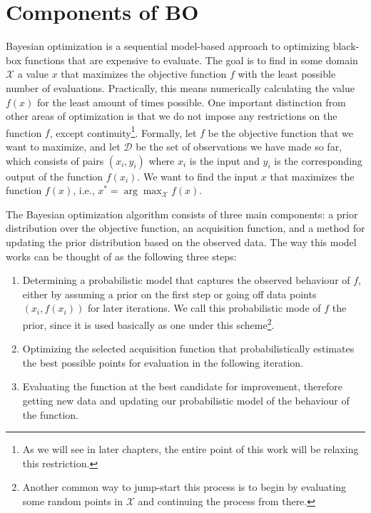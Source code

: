 \section{Components of BO}

Bayesian optimization is a sequential model-based approach to optimizing black-box functions that are expensive to evaluate. The goal is to find in some domain $\mathcal{X}$ a value $x$ that maximizes the objective function $f$ with the least possible number of evaluations. Practically, this means numerically calculating the value $f(x)$ for the least amount of times possible. One important distinction from other areas of optimization is that we do not impose any restrictions on the function $f$, except continuity\footnote{As we will see in later chapters, the entire point of this work will be relaxing this restriction.}. Formally, let $f$ be the objective function that we want to maximize, and let $\mathcal{D}$ be the set of observations we have made so far, which consists of pairs $(x_i, y_i)$ where $x_i$ is the input and $y_i$ is the corresponding output of the function $f(x_i)$. We want to find the input $x$ that maximizes the function $f(x)$, i.e., $x^* = \arg\max_\mathcal{X}  f(x)$.

The Bayesian optimization algorithm consists of three main components: a prior distribution over the objective function, an acquisition function, and a method for updating the prior distribution based on the observed data. The way this model works can be thought of as the following three steps: 
\begin{enumerate}
	\item Determining a probabilistic model that captures the observed behaviour of $f$, either by assuming a prior on the first step or going off data points $(x_i, f(x_i))$ for later iterations. We call this probabilistic mode of $f$ the prior, since it is used basically as one under this scheme\footnote{Another common way to jump-start this process is to begin by evaluating some random points in $\mathcal{X}$ and continuing the process from there. }.
	\item Optimizing the selected acquisition function that probabilistically estimates the best possible points for evaluation in the following iteration. 
	\item Evaluating the function at the best candidate for improvement, therefore getting new data and updating our probabilistic model of the behaviour of the function. 
\end{enumerate}

